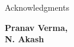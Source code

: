 \begin{center}
\LARGE{Acknowledgments} 
\end{center}

\vspace{0.5in}

\lipsum[1]

\vspace{1.5in}

{\bfseries Pranav Verma,} \\
{\bfseries N. Akash}
